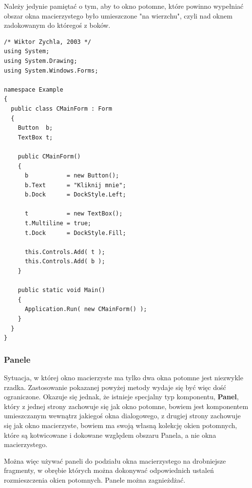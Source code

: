 Należy jedynie pamiętać o tym, aby to okno potomne, które powinno wypełniać obszar okna macierzystego
było umieszczone "na wierzchu", czyli nad oknem zadokowanym do któregoś z boków. 

\begin{scriptsize}
\begin{verbatim}
/* Wiktor Zychla, 2003 */
using System;
using System.Drawing;
using System.Windows.Forms;

namespace Example
{
  public class CMainForm : Form
  {   
    Button  b; 
    TextBox t;

    public CMainForm()
    {
      b           = new Button();
      b.Text      = "Kliknij mnie";
      b.Dock      = DockStyle.Left;

      t           = new TextBox();
      t.Multiline = true; 
      t.Dock      = DockStyle.Fill;
      
      this.Controls.Add( t );
      this.Controls.Add( b );
    } 

    public static void Main()
    {
      Application.Run( new CMainForm() );
    }
  }
}
\end{verbatim}
\end{scriptsize}

\subsubsection{Panele}

Sytuacja, w której okno macierzyste ma tylko dwa okna potomne jest niezwykle rzadka. Zastosowanie
pokazanej powyżej metody wydaje się być więc dość ograniczone. Okazuje się jednak, że istnieje specjalny typ
komponentu, {\bf Panel}, który z jednej strony zachowuje się jak okno potomne, bowiem jest 
komponentem umieszczanym wewnątrz jakiegoś okna dialogowego, z drugiej strony zachowuje się jak
okno macierzyste, bowiem ma swoją własną kolekcję okien potomnych, które są kotwicowane i dokowane 
względem obszaru Panela, a nie okna macierzystego.

Można więc używać paneli do podziału okna macierzystego na drobniejsze fragmenty, w obrębie których można
dokonywać odpowiednich ustaleń rozmieszczenia okien potomnych. Panele można zagnieżdżać.

